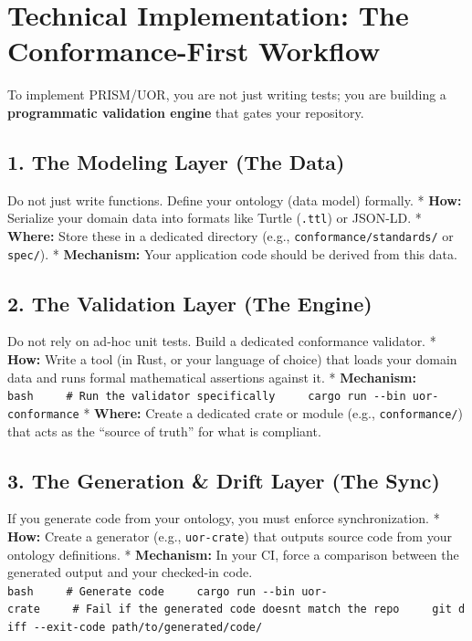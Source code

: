 \documentclass[12pt,a4paper]{article}
\begin{document}
\section{Technical Implementation: The Conformance-First
Workflow}\label{technical-implementation-the-conformance-first-workflow}

To implement PRISM/UOR, you are not just writing tests; you are building
a \textbf{programmatic validation engine} that gates your repository.

\subsection{1. The Modeling Layer (The
Data)}\label{the-modeling-layer-the-data}

Do not just write functions. Define your ontology (data model) formally.
* \textbf{How:} Serialize your domain data into formats like Turtle
(\texttt{.ttl}) or JSON-LD. * \textbf{Where:} Store these in a dedicated
directory (e.g., \texttt{conformance/standards/} or \texttt{spec/}). *
\textbf{Mechanism:} Your application code should be derived from this
data.

\subsection{2. The Validation Layer (The
Engine)}\label{the-validation-layer-the-engine}

Do not rely on ad-hoc unit tests. Build a dedicated conformance
validator. * \textbf{How:} Write a tool (in Rust, or your language of
choice) that loads your domain data and runs formal mathematical
assertions against it. * \textbf{Mechanism:}
\texttt{bash\ \ \ \ \ \#\ Run\ the\ validator\ specifically\ \ \ \ \ cargo\ run\ -\/-bin\ uor-conformance}
* \textbf{Where:} Create a dedicated crate or module (e.g.,
\texttt{conformance/}) that acts as the ``source of truth'' for what is
compliant.

\subsection{3. The Generation \& Drift Layer (The
Sync)}\label{the-generation-drift-layer-the-sync}

If you generate code from your ontology, you must enforce
synchronization. * \textbf{How:} Create a generator (e.g.,
\texttt{uor-crate}) that outputs source code from your ontology
definitions. * \textbf{Mechanism:} In your CI, force a comparison
between the generated output and your checked-in code.
\texttt{bash\ \ \ \ \ \#\ Generate\ code\ \ \ \ \ cargo\ run\ -\/-bin\ uor-crate\ \ \ \ \ \#\ Fail\ if\ the\ generated\ code\ doesn\textquotesingle{}t\ match\ the\ repo\ \ \ \ \ git\ diff\ -\/-exit-code\ path/to/generated/code/}
\end{document}
